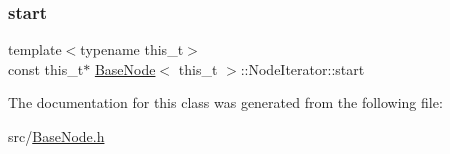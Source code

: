 \mbox{\label{class_base_node_1_1_node_iterator_a0583943df31aaf646c09338a1ba866c1}} 
\subsubsection{\texorpdfstring{start}{start}}
{\footnotesize\ttfamily template$<$typename this\+\_\+t$>$ \\
const this\+\_\+t$\ast$ \hyperlink{class_base_node}{Base\+Node}$<$ this\+\_\+t $>$\+::Node\+Iterator\+::start\hspace{0.3cm}{\ttfamily [protected]}}



The documentation for this class was generated from the following file\+:\begin{DoxyCompactItemize}
\item 
src/\hyperlink{_base_node_8h}{Base\+Node.\+h}\end{DoxyCompactItemize}
